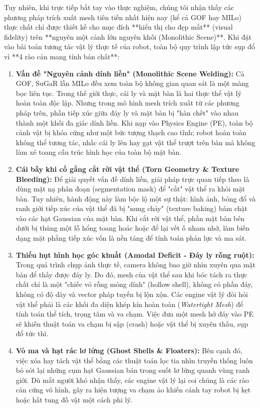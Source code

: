 Tuy nhiên, khi trực tiếp bắt tay vào thực nghiệm, chúng tôi nhận thấy các phương pháp trích xuất mesh tiên tiến nhất hiện nay (kể cả GOF hay MILo) thực chất chỉ được thiết kế cho mục đích **hiển thị cho đẹp mắt** (visual fidelity) trên **nguyên một cảnh lớn nguyên khối (Monolithic Scene)**. Khi đặt vào bài toán tương tác vật lý thực tế của robot, toàn bộ quy trình lập tức sụp đổ vì **4 rào cản mang tính bản chất**:

\begin{enumerate}
    \item \textbf{Vấn đề "Nguyên cảnh dính liền" (Monolithic Scene Welding):}  
    Cả GOF, SuGaR lẫn MILo đều xem toàn bộ không gian quan sát là một màng bọc liên tục. Trong thế giới thực, cái ly và mặt bàn là hai thực thể vật lý hoàn toàn độc lập. Nhưng trong mô hình mesh trích xuất từ các phương pháp trên, phần tiếp xúc giữa đáy ly và mặt bàn bị "hàn chết" vào nhau thành một khối đa giác dính liền. Khi nạp vào Physics Engine (PE), toàn bộ cảnh vật bị khóa cứng như một bức tượng thạch cao tĩnh; robot hoàn toàn không thể tương tác, nhấc cái ly lên hay gạt vật thể trượt trên bàn mà không làm xé toang cấu trúc hình học của toàn bộ mặt bàn.

    \item \textbf{Cái bẫy khi cố gắng cắt rời vật thể (Torn Geometry \& Texture Bleeding):}  
    Để giải quyết vấn đề dính liền, giải pháp trực quan tiếp theo là dùng mặt nạ phân đoạn (segmentation mask) để "cắt" vật thể ra khỏi mặt bàn. Tuy nhiên, hành động này làm bộc lộ một sự thật: hình ảnh, bóng đổ và ranh giới tiếp xúc của vật thể đã bị "nung chảy" (texture baking) bám chặt vào các hạt Gaussian của mặt bàn. Khi cắt rời vật thể, phần mặt bàn bên dưới bị thủng một lỗ hổng toang hoác hoặc để lại vết ố nham nhở, làm biến dạng mặt phẳng tiếp xúc vốn là nền tảng để tính toán phản lực và ma sát.

    \item \textbf{Thiếu hụt hình học góc khuất (Amodal Deficit - Đáy ly rỗng ruột):}  
    Trong quá trình chụp ảnh thực tế, camera không bao giờ nhìn xuyên qua mặt bàn để thấy được đáy ly. Do đó, mesh của vật thể sau khi bóc tách ra thực chất chỉ là một "chiếc vỏ rỗng mỏng dính" (hollow shell), không có phần đáy, không có độ dày và vector pháp tuyến bị lộn xộn. Các engine vật lý đòi hỏi vật thể phải là các khối đa diện khép kín hoàn toàn (\textit{Watertight Mesh}) để tính toán thể tích, trọng tâm và va chạm. Việc đưa một mesh hở đáy vào PE sẽ khiến thuật toán va chạm bị sập (crash) hoặc vật thể bị xuyên thấu, sụp đổ tức thì.

    \item \textbf{Vỏ ma và hạt rác lơ lửng (Ghost Shells \& Floaters):}  
    Bên cạnh đó, việc xóa hay tách vật thể bằng các thuật toán lọc tia nhìn truyền thống luôn bỏ sót lại những cụm hạt Gaussian bán trong suốt lơ lửng quanh vùng ranh giới. Dù mắt người khó nhận thấy, các engine vật lý lại coi chúng là các rào cản cứng vô hình, gây ra hiện tượng va chạm ảo khiến cánh tay robot bị kẹt hoặc hất tung đồ vật một cách phi lý.
\end{enumerate}

